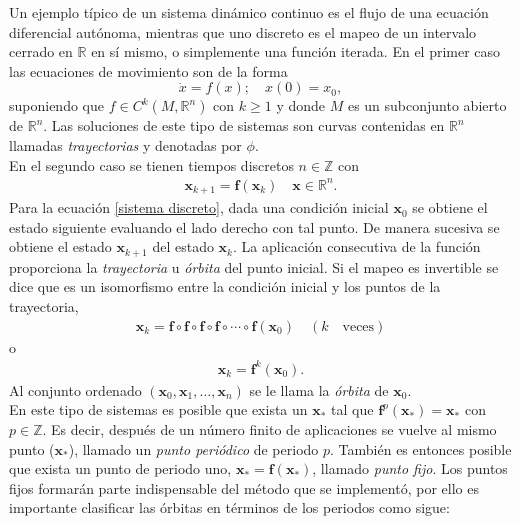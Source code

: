 Un ejemplo típico de un sistema dinámico continuo es el flujo de una ecuación diferencial autónoma, mientras que uno discreto es el mapeo de un intervalo cerrado en $\mathbb{R}$ en sí mismo, o simplemente una función iterada. En el primer caso las ecuaciones de movimiento son de la forma
\begin{equation}
\dot{x} =  f(x); \quad  
x(0)=x_{0} , \label{ec dif}
\end{equation}
suponiendo que $f \in C^{k}(M,\mathbb{R}^{n})$ con $k \geq 1$ y donde $M$ es un subconjunto abierto de $\mathbb{R}^{n}$. Las soluciones de este tipo de sistemas son curvas contenidas en $\mathbb{R}^{n}$ llamadas \textit{trayectorias} y denotadas por $\phi$.\\
En el segundo caso se tienen tiempos discretos $n\in \mathbb{Z}$ con 
\begin{eqnarray}
\pmb x_{k+1}= \mathbf{f}(\pmb x_{k}) \quad \pmb x\in \mathbb{R}^{n}. \label{sistema discreto}
\end{eqnarray}
Para la ecuación \eqref{sistema discreto}, dada una condición inicial $\pmb x_{0}$ se obtiene el estado siguiente evaluando el lado derecho con tal punto. De manera sucesiva se obtiene el estado $\pmb x_{k+1}$ del estado $\pmb x_{k}$. La aplicación consecutiva de la función proporciona la \textit{trayectoria} u \textit{órbita} del punto inicial. Si el mapeo es invertible se dice que es un isomorfismo entre la condición inicial y los puntos de la trayectoria,
\begin{eqnarray*}
\pmb x_{k}=\mathbf{f}\circ\mathbf{f}\circ \mathbf{f} \circ \mathbf{f} \circ  \cdots \circ \mathbf{f} (\pmb x_{0})\quad (k \quad \textrm{veces})
\end{eqnarray*}
o
\begin{eqnarray*}
\pmb x_{k} = \mathbf{f}^{k}(\pmb x_{0}).
\end{eqnarray*}
Al conjunto ordenado $( \pmb x_{0},\pmb x_{1},\ldots,\pmb x_{n} )$ se le llama la \textit{órbita} de $\pmb x_{0}$.\\

En este tipo de sistemas es posible que exista un $\pmb x_{*}$ tal que $\mathbf{f}^{p}(\pmb x_{*})=\pmb x_{*}$ con $p \in \mathbb{Z}$. Es decir, después de un número finito de aplicaciones se vuelve al mismo punto ($\pmb x_{*}$), llamado un \textit{punto periódico} de periodo $p$. También es entonces posible  que exista un punto de periodo uno, $\pmb x_{*}=\mathbf{f}(\pmb x_{*})$, llamado \textit{punto fijo}. Los puntos fijos formarán parte indispensable del método que se implementó, por ello es importante clasificar las órbitas en términos de los periodos como sigue:

